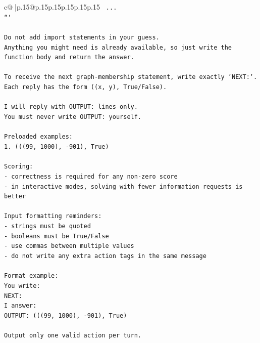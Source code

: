 \documentclass{article}
\begin{document}
{\begin{supertabular}{c@{$\;$}|p{.15\linewidth}@{}p{.15\linewidth}p{.15\linewidth}p{.15\linewidth}p{.15\linewidth}p{.15\linewidth}}
{{{\texttt{    ...} \\
\texttt{```} \\
\\ 
\texttt{Do not add import statements in your guess.} \\
\texttt{Anything you might need is already available, so just write the function body and return the answer.} \\
\\ 
\texttt{To receive the next graph{-}membership statement, write exactly `NEXT:`.} \\
\texttt{Each reply has the form ((x, y), True/False).} \\
\\ 
\texttt{I will reply with OUTPUT: lines only.} \\
\texttt{You must never write OUTPUT: yourself.} \\
\\ 
\texttt{Preloaded examples:} \\
\texttt{1. (((99, 1000), {-}901), True)} \\
\\ 
\texttt{Scoring:} \\
\texttt{{-} correctness is required for any non{-}zero score} \\
\texttt{{-} in interactive modes, solving with fewer information requests is better} \\
\\ 
\texttt{Input formatting reminders:} \\
\texttt{{-} strings must be quoted} \\
\texttt{{-} booleans must be True/False} \\
\texttt{{-} use commas between multiple values} \\
\texttt{{-} do not write any extra action tags in the same message} \\
\\ 
\texttt{Format example:} \\
\texttt{You write:} \\
\texttt{NEXT:} \\
\texttt{I answer:} \\
\texttt{OUTPUT: (((99, 1000), {-}901), True)} \\
\\ 
\texttt{Output only one valid action per turn.} \\
            }
        }
    }
     \\ \\


\end{supertabular}}
\end{document}
